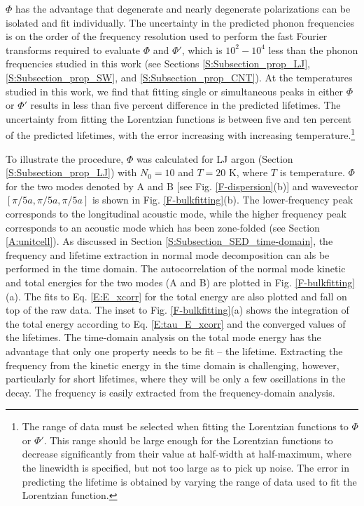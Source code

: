 $\Phi$ has the advantage that degenerate and nearly degenerate 
polarizations can be isolated and fit individually. The uncertainty 
in the predicted phonon frequencies is 
on the order of the frequency resolution used to perform the fast 
Fourier transforms required to evaluate $\Phi$ and $\Phi'$, which is 
$10^2-10^4$ less than the phonon frequencies 
studied in this work (see Sections \ref{S:Subsection_prop_LJ}, 
\ref{S:Subsection_prop_SW}, 
and \ref{S:Subsection_prop_CNT}). At the temperatures studied in this work, 
we find that 
fitting single or simultaneous peaks in either $\Phi$ or $\Phi'$ results 
in less than five 
percent difference in the predicted lifetimes. The uncertainty from 
fitting the Lorentzian 
functions is between five and ten percent of the predicted lifetimes, 
with the error increasing 
with increasing temperature.\footnote{The range of data must be 
selected when fitting the 
Lorentzian functions to $\Phi$ or $\Phi'$. This range should be large 
enough for the Lorentzian 
functions to decrease significantly from their value at
half-width at half-maximum, where the linewidth is specified, but not 
too large as to pick up 
noise. The error in predicting the lifetime is obtained by varying the 
range of data
used to fit the Lorentzian function.}

To illustrate the procedure, $\Phi$ was calculated for LJ argon (Section 
\ref{S:Subsection_prop_LJ}) with $N_0=10$ and $T=20$ K, where $T$ is 
temperature.
$\Phi$ for the two modes denoted by A and B 
[see Fig. \ref{F-dispersion}(b)] 
and wavevector $[\pi/5a,\pi/5a,\pi/5a]$ 
is shown in Fig$.$ \ref{F-bulkfitting}(b). 
The lower-frequency peak 
corresponds to the longitudinal acoustic mode,
\cite{dove_introduction_1993} while the higher 
frequency peak corresponds to an acoustic mode which has been 
zone-folded (see Section \ref{A:unitcell}). 
As discussed in Section \ref{S:Subsection_SED_time-domain}, the frequency 
and lifetime extraction in normal mode decomposition can als be performed 
in the time domain. The autocorrelation of the normal 
mode kinetic and total energies for the two modes (A and B) 
are plotted in Fig. \ref{F-bulkfitting}(a). The fits to 
Eq. \eqref{E:E_xcorr} for the total energy are also plotted and 
fall on top of the raw data.  The inset to Fig. \ref{F-bulkfitting}(a) 
shows the integration of the total energy according to 
Eq. \eqref{E:tau_E_xcorr} and the converged values of the lifetimes. 
The time-domain analysis on the total mode 
energy has the advantage that only one property needs to be fit -- 
the lifetime. Extracting the frequency from the kinetic energy in the 
time domain is challenging, however, particularly for short lifetimes, 
where they will be only a few oscillations in the decay. The frequency 
is easily extracted from the frequency-domain analysis.

